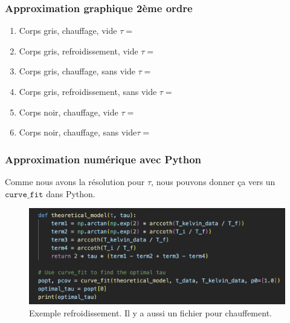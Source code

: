 \documentclass{beamer}
\begin{document}
\begin{frame}
\frametitle{Approximation graphique 2ème ordre}
\begin{enumerate}
	\item{{\color{gray7}Corps gris}{\color{gray4}, {\color{red}chauffage}, vide} \hfill $\tau = $\hspace{4em} \newline}
	\item{{\color{gray7}Corps gris}{\color{gray4}, {\color{blue5}refroidissement}, vide} \hfill $\tau = $\hspace{4em} \newline}
	\item{{\color{gray7}Corps gris}{\color{gray4}, {\color{red}chauffage}, sans vide} \hfill $\tau = $\hspace{4em} \newline}
	\item{{\color{gray7}Corps gris}{\color{gray4}, {\color{blue5}refroidissement}, sans vide} \hfill $\tau = $\hspace{4em} \newline}
	\item{{\color{black}Corps noir}{\color{gray4}, {\color{red}chauffage}, vide} \hfill $\tau = $\hspace{4em} \newline}
	\item{{\color{black}Corps noir}{\color{gray4}, {\color{red}chauffage}, sans vide}\hfill $\tau = $\hspace{4em} \newline}
\end{enumerate}

\end{frame}





\begin{frame}
\frametitle{Approximation numérique avec Python}
Comme nous avons la résolution pour $\tau$, nous pouvons donner ça vers un $\texttt{curve\_fit}$ dans Python.

\begin{figure}
\includegraphics[width=\textwidth]{Fig/Python_Refroid.png}
\caption{Exemple refroidissement. Il y a aussi un fichier pour chauffement.}
\end{figure}

\end{frame}
\end{document}
